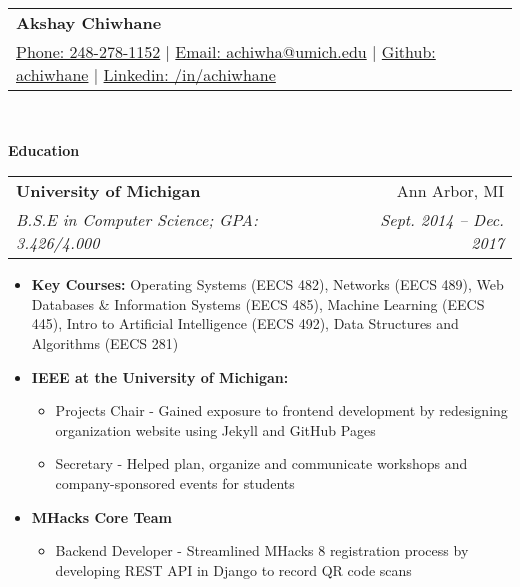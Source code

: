 \documentclass[letterpaper,11pt]{article}
\makeatletter
\newcommand{\resitem}[1]{\item #1 \vspace{-2pt}}
\newcommand{\resheading}[1]{{\large \colorbox{mygrey}{\begin{minipage}{\textwidth}{\textbf{#1 \vphantom{p\^{E}}}}\end{minipage}}}}
\newcommand{\ressubheading}[4]{
\begin{tabular*}{6.875in}{l@{\extracolsep{\fill}}r}
		\textbf{#1} & #2 \\
		\textit{#3} & \textit{#4} \\
\end{tabular*}\vspace{-6pt}}
\renewcommand{\footnotesize}{\fontsize{10pt}{11pt}\selectfont}
\makeatother
\begin{document}
\newcommand{\mywebheader}{
	\begin{tabular*}{7in}{l@{\extracolsep{\fill}}r}
		\textbf{{\LARGE Akshay Chiwhane}} \\
			\href{tel:248-278-1152}{Phone: 248-278-1152} |
			\href{mailto:achiwha@umich.edu}{Email: achiwha@umich.edu} |
			\href{https://github.com/achiwhane}{Github: achiwhane} |
			\href{https://linkedin.com/in/achiwhane}{Linkedin: /in/achiwhane}	\end{tabular*}
		\\
		\vspace{0.1in}}
		
		\mywebheader
		
		\resheading{Education}
		\begin{description}
			\item
			\ressubheading{{University of Michigan}}{Ann Arbor, MI}{B.S.E in Computer Science; GPA: 3.426/4.000}{Sept. 2014 -- Dec. 2017}
			{ \footnotesize
				\begin{itemize}
					\resitem{\textbf{Key Courses:}
						Operating Systems (EECS 482), 
						Networks (EECS 489),
						Web Databases \& Information Systems (EECS 485),
						Machine Learning (EECS 445),
						Intro to Artificial Intelligence (EECS 492),
						Data Structures and Algorithms (EECS 281)
					}
					\resitem{\textbf{IEEE at the University of Michigan:}} 
					\begin{itemize}
						\resitem{Projects Chair - Gained exposure to frontend development by redesigning organization website using Jekyll and GitHub Pages}
						\resitem{Secretary - Helped plan, organize and communicate workshops and company-sponsored events for students} 
					\end{itemize}
					\resitem{\textbf{MHacks Core Team}} 
					\begin{itemize}
						\resitem{Backend Developer - Streamlined MHacks 8 registration process by developing REST API in Django to record QR code scans}
					\end{itemize}
				\end{itemize}
			}
		\end{description} %
		
\end{document}

